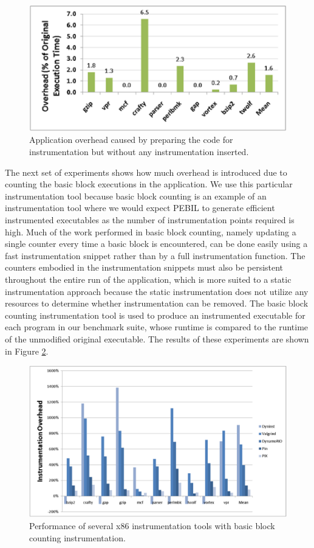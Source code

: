 \begin{figure}[ht]
\centering
\label{fig:RelocOverhead}
\includegraphics[scale=0.6]{relocperf.eps}
\caption{Application overhead caused by preparing the code for instrumentation but without
any instrumentation inserted.}
\end{figure}

The next set of experiments shows how much overhead is introduced due to counting the
basic block executions in the application. We use this particular instrumentation tool because basic block counting
is an example of an instrumentation tool where we would expect PEBIL to generate efficient instrumented executables
as the number of instrumentation points required is high. Much of the work performed in basic block counting, namely updating a single
counter every time a basic block is encountered, can be done easily using a fast instrumentation snippet rather than
by a full instrumentation function. The counters embodied in the instrumentation snippets must also be
persistent throughout the entire run of the application, which is more suited to a static instrumentation approach
because the static instrumentation does not utilize any resources to determine whether instrumentation can be removed.
The basic block counting instrumentation tool is used to produce an instrumented
executable for each program in our benchmark suite, whose runtime is compared to the runtime of the 
unmodified original executable. The results of these experiments are shown in Figure \ref{fig:ToolOverheads}. 

\begin{figure}[ht]
\centering
\label{fig:ToolOverheads}
\includegraphics[scale=0.32]{bbcount.eps}
\caption{Performance of several x86 instrumentation tools with basic block counting instrumentation.}
\end{figure}

